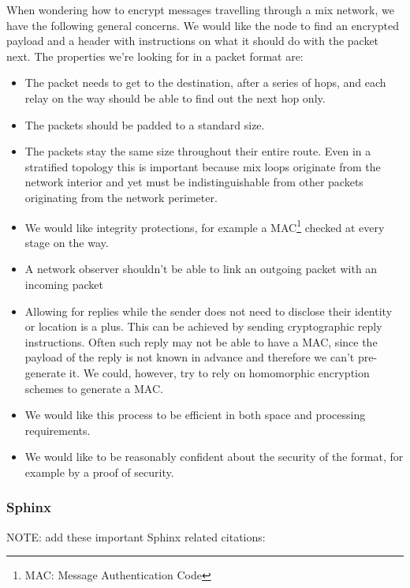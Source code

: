 \documentclass{article}
\begin{document}
When wondering how to encrypt messages travelling through a mix network, we have the following general concerns. We would like the node to find an encrypted payload and a header with instructions on what it should do with the packet next. The properties we're looking for in a packet format are:
\begin{itemize}
\item The packet needs to get to the destination, after a series of hops, and each relay on the way should be able to find out the next hop only.
\item The packets should be padded to a standard size.
\item The packets stay the same size throughout their entire route. Even in a stratified topology this is important because mix loops originate from the network interior and yet must be indistinguishable from other packets originating from the network perimeter.
\item We would like integrity protections, for example a MAC\footnote{MAC: Message Authentication Code} checked at every stage on the way.
\item A network observer shouldn't be able to link an outgoing packet with an incoming packet
\item Allowing for replies while the sender does not need to disclose their identity or location is a plus. This can be achieved by sending cryptographic reply instructions. Often such reply may not be able to have a MAC, since the payload of the reply is not known in advance and therefore we can't pre-generate it. We could, however, try to rely on homomorphic encryption schemes to generate a MAC.
\item We would like this process to be efficient in both space and processing requirements.
\item We would like to be reasonably confident about the security of the format, for example by a proof of security.
\end{itemize}

\subsubsection{Sphinx}

NOTE: add these important Sphinx related citations:
\end{document}
